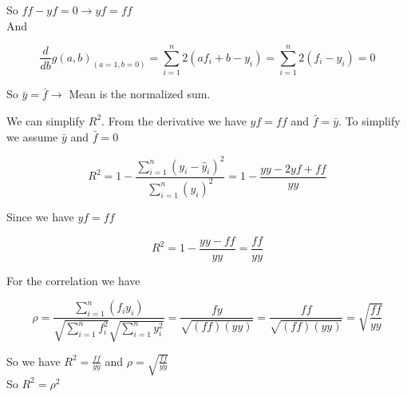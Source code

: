 So $ff - yf = 0 \rightarrow yf = ff $ \\


And

\[ \frac{d}{db}g(a,b)_{(a = 1, b = 0)} = \sum\limits_{i=1}^n 2(af_i + b - y_i) = \sum\limits_{i=1}^n 2(f_i - y_i) = 0  \]

So $\bar{y} = \bar{f} \rightarrow$ Mean is the normalized sum.


\noindent We can simplify $R^2$. From the derivative we have $yf = ff$ and $\bar{f} = \bar{y}$. To simplify we assume $\bar{y}$ and $\bar{f} = 0 $

\[ R^2 = 1 - \frac{\sum\limits_{i=1}^n (y_i - \hat{y}_i)^2}{\sum\limits_{i=1}^n (y_i)^2} = 1 - \frac{yy - 2yf + ff}{yy} \]

Since we have $yf = ff$

\[ R^2 = 1 - \frac{yy - ff}{yy}  = \frac{ff}{yy}\]

For the correlation we have 

\[ \rho =  \frac{\sum\limits_{i=1}^n(f_i y_i)}{\sqrt{\sum\limits_{i=1}^n f_i ^2}\sqrt{\sum\limits_{i=1}^n y_i^2}}  = \frac{fy}{\sqrt{(ff)(yy)}} = \frac{ff}{\sqrt{(ff)(yy)}} = \sqrt{\frac{ff}{yy}}\]



So we have $R^2 = \frac{ff}{yy}$ and $\rho = \sqrt{\frac{ff}{yy}}$\\


So $R^2 = \rho^2$














